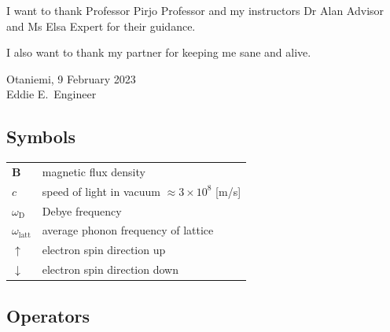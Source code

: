 \documentclass[english, 12pt, a4paper, biz, utf8, a-2b, online]{aaltothesis}
\begin{document}


\dothesispagenumbering{}

I want to thank Professor Pirjo Professor and my instructors Dr Alan Advisor and
Ms Elsa Expert for their guidance.

I also want to thank my partner for keeping me sane and alive.

\vspace{5cm}
Otaniemi, 9 February 2023\\

\vspace{5mm}
{\hfill Eddie E.\ Engineer \hspace{1cm}}

\newpage


\thesistableofcontents



\subsection*{Symbols}

\begin{tabular}{ll}
$\mathbf{B}$  & magnetic flux density  \\
$c$              & speed of light in vacuum $\approx 3\times10^8$ [m/s]\\
$\omega_{\mathrm{D}}$    & Debye frequency \\
$\omega_{\mathrm{latt}}$ & average phonon frequency of lattice \\
$\uparrow$       & electron spin direction up\\
$\downarrow$     & electron spin direction down
\end{tabular}

\subsection*{Operators}
\end{document}
